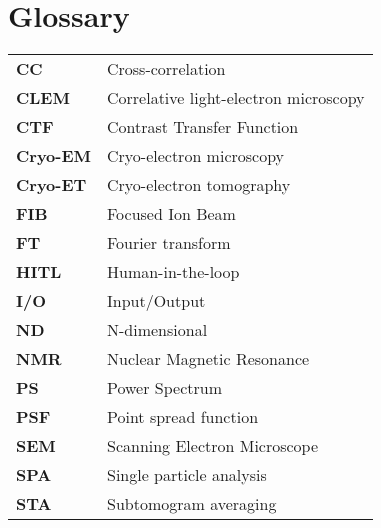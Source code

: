\chapter{Glossary}


\begin{tabularx}{\linewidth}{@{}>{\bfseries}l X} %
CC & Cross-correlation \\
CLEM & Correlative light-electron microscopy \\
CTF & Contrast Transfer Function \\
Cryo-EM & Cryo-electron microscopy \\
Cryo-ET & Cryo-electron tomography \\
FIB & Focused Ion Beam \\
FT & Fourier transform \\
HITL & Human-in-the-loop \\
I/O & Input/Output \\
ND & N-dimensional \\
NMR & Nuclear Magnetic Resonance \\
PS & Power Spectrum \\
PSF & Point spread function \\
SEM & Scanning Electron Microscope \\
SPA & Single particle analysis \\
STA & Subtomogram averaging \\
\end{tabularx}
